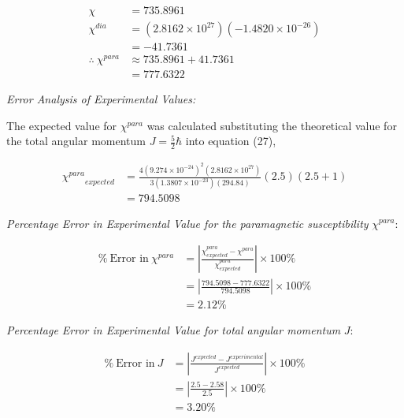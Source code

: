 \documentclass[a4paper,11pt]{article}
\begin{document}
\begin{align}
\chi					& = 735.8961\nonumber\\
\chi^{\textit{dia}}		& = (2.8162 \times 10^{27}) (-1.4820 \times 10^{-26})\nonumber\\
						& = -41.7361\\
\therefore~\chi^{\textit{para}}	& \approx 735.8961 + 41.7361\nonumber\\
								& = 777.6322
\end{align}

\begin{center}
\textit{Error Analysis of Experimental Values:}
\end{center}

The expected value for $\chi^{\textit{para}}$ was calculated substituting the theoretical value for the total angular momentum $J = \frac{5}{2}\hbar$ into equation (27), 

\begin{align}
{\chi^{\textit{para}}}_{\textit{expected}}	& = \frac{4 (9.274 \times 10^{-24})^2 (2.8162 \times 10^{27})}{3 (1.3807 \times 														10^{-23}) (294.84)}(2.5)(2.5+1)\nonumber\\
											& = 794.5098\nonumber
\end{align}

\textit{Percentage Error in Experimental Value for the paramagnetic susceptibility} $\chi^{\textit{para}}$:

\begin{align}
\%~\text{Error in}~\chi^{\textit{para}}	& = \left| \frac{\chi^{\textit{para}}_{\textit{expected}} - \chi^{\textit{para}}}														{\chi^{\textit{para}}_{\textit{expected}}} \right| \times 100\%\nonumber\\
										& = \left| \frac{794.5098 - 777.6322}{794.5098} \right| \times 100\%\nonumber\\
										& = 2.12\%
\end{align}

\textit{Percentage Error in Experimental Value for total angular momentum} $J$:

\begin{align}
\%~\text{Error in}~J	& = \left| \frac{J^{\textit{expected}} - J^{\textit{experimental}}}{J^{\textit{expected}}} \right| \times 100\% \nonumber\\
					& = \left| \frac{2.5 - 2.58}{2.5} \right| \times 100\%\nonumber\\
					& = 3.20\%
\end{align}
\end{document}
